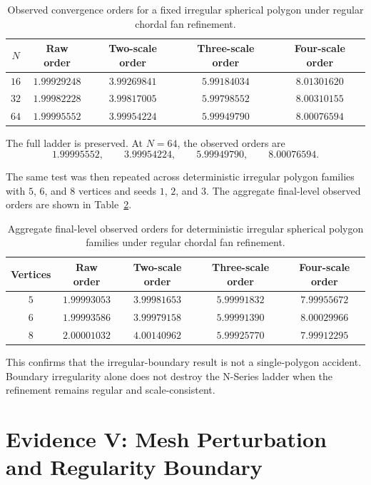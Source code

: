 \documentclass[11pt]{article}
\begin{document}
\begin{table}[ht]
\centering
\small
\begin{tabular}{ccccc}
\toprule
$N$ & Raw order & Two-scale order & Three-scale order & Four-scale order \\
\midrule
$16$ & $1.99929248$ & $3.99269841$ & $5.99184034$ & $8.01301620$ \\
$32$ & $1.99982228$ & $3.99817005$ & $5.99798552$ & $8.00310155$ \\
$64$ & $1.99995552$ & $3.99954224$ & $5.99949790$ & $8.00076594$ \\
\bottomrule
\end{tabular}
\caption{Observed convergence orders for a fixed irregular spherical polygon
under regular chordal fan refinement.}
\label{tab:single-irregular-polygon-orders}
\end{table}

The full ladder is preserved.  At $N=64$, the observed orders are
\[
  1.99995552,\qquad
  3.99954224,\qquad
  5.99949790,\qquad
  8.00076594.
\]

The same test was then repeated across deterministic irregular polygon
families with $5$, $6$, and $8$ vertices and seeds $1$, $2$, and $3$.  The
aggregate final-level observed orders are shown in
Table~\ref{tab:batch-irregular-polygon-orders}.

\begin{table}[ht]
\centering
\small
\begin{tabular}{ccccc}
\toprule
Vertices & Raw order & Two-scale order & Three-scale order & Four-scale order \\
\midrule
$5$ & $1.99993053$ & $3.99981653$ & $5.99991832$ & $7.99955672$ \\
$6$ & $1.99993586$ & $3.99979158$ & $5.99991390$ & $8.00029966$ \\
$8$ & $2.00001032$ & $4.00140962$ & $5.99925770$ & $7.99912295$ \\
\bottomrule
\end{tabular}
\caption{Aggregate final-level observed orders for deterministic irregular
spherical polygon families under regular chordal fan refinement.}
\label{tab:batch-irregular-polygon-orders}
\end{table}

This confirms that the irregular-boundary result is not a single-polygon
accident.  Boundary irregularity alone does not destroy the N-Series ladder
when the refinement remains regular and scale-consistent.

\section{Evidence V: Mesh Perturbation and Regularity Boundary}
\end{document}
